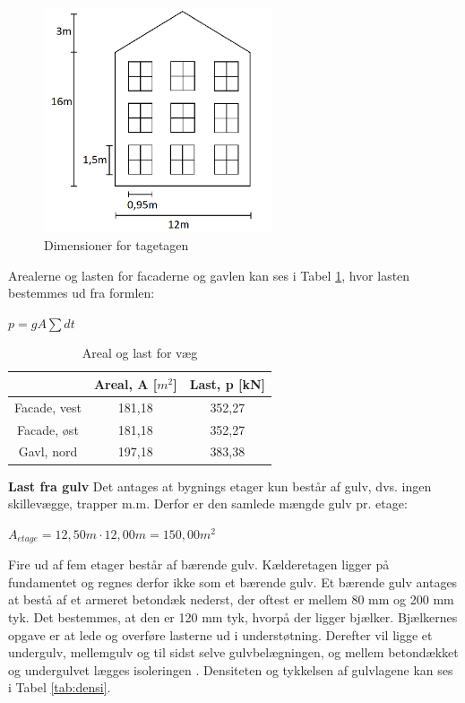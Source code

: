 \begin{figure}[H]
	\centering
	\includegraphics[width=0.6\textwidth]{billeder/facadevestellerost.png}
	\caption{Dimensioner for tagetagen}
	\label{fig:gavl}
\end{figure}

Arealerne og lasten for facaderne og gavlen kan ses i Tabel \ref{tab:arealoglast}, hvor lasten bestemmes ud fra formlen:
\begin{center}
	$p = g A \sum dt$
\end{center}

\begin{table}
	\begin{center}
		\begin{tabular}{|c|c|c|}
			\hline
			& Areal, A [$m^2$]   & Last, p [kN]    \\ \hline
			Facade, vest & 181,18 & 352,27 \\ \hline
			Facade, øst  & 181,18 & 352,27 \\ \hline
			Gavl, nord   & 197,18 & 383,38 \\ \hline
		\end{tabular}
		\caption{Areal og last for væg}
		\label{tab:arealoglast}
	\end{center}
\end{table}

\textbf{Last fra gulv}
\newline
Det antages at bygnings etager kun består af gulv, dvs. ingen skillevægge, trapper m.m. Derfor er den samlede mængde gulv pr. etage: 

\begin{center}
$A_{etage} = 12,\!50 m\cdot 12,\!00 m = 150,\!00 m^2$
\end{center}

Fire ud af fem etager består af bærende gulv. Kælderetagen ligger på fundamentet og regnes derfor ikke som et bærende gulv. 
\newline \indent{     }  Et bærende gulv antages at bestå af et armeret betondæk nederst, der oftest er mellem 80 mm og 200 mm tyk. Det bestemmes, at den er 120 mm tyk, hvorpå der ligger bjælker. Bjælkernes opgave er at lede og overføre lasterne ud i understøtning. Derefter vil ligge et undergulv, mellemgulv og til sidst selve gulvbelægningen, og mellem betondækket og undergulvet lægges isoleringen \citep{Gulvopbygning}. Densiteten og tykkelsen af gulvlagene kan ses i Tabel \ref{tab:densi}.

